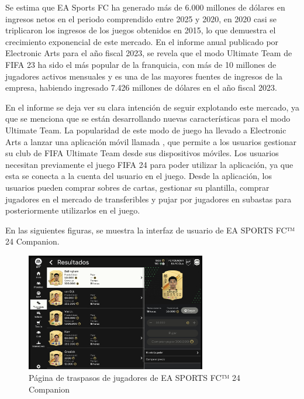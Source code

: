 Se estima que EA Sports FC ha generado más de 6.000 millones de dólares en ingresos netos en el periodo comprendido entre 2025 y 2020\cite{sanmartin000MillonesDolares2021}, en 2020 casi se triplicaron los ingresos de los juegos obtenidos en 2015, lo que demuestra el crecimiento exponencial de este mercado.
En el informe anual publicado por Electronic Arts para el año fiscal 2023\cite{ea2023}, se revela que el modo Ultimate Team de FIFA 23 ha sido el más popular de la franquicia, con más de 10 millones de jugadores activos mensuales y es una de las mayores fuentes de ingresos de la empresa, habiendo ingresado 7.426 millones de dólares en el año fiscal 2023. 

En el informe se deja ver su clara intención de seguir explotando este mercado, ya que se menciona que se están desarrollando nuevas características para el modo Ultimate Team.
La popularidad de este modo de juego ha llevado a Electronic Arts a lanzar una aplicación móvil llamada , que permite a los usuarios gestionar su club de FIFA Ultimate Team desde sus dispositivos móviles.
Los usuarios necesitan previamente el juego FIFA 24 para poder utilizar la aplicación, ya que esta se conecta a la cuenta del usuario en el juego. Desde la aplicación, los usuarios pueden comprar sobres de cartas, gestionar su plantilla, comprar jugadores en el mercado de transferibles y pujar por jugadores en subastas para posteriormente utilizarlos en el juego.

En las siguientes figuras, se muestra la interfaz de usuario de EA SPORTS FC™ 24 Companion. 
\begin{figure}[H]
    \centering
    \includegraphics[width=0.7\textwidth]{figures/4-Estudio-viabilidad/4_FC_Companion.png}
    \caption{Página de traspasos de jugadores de EA SPORTS FC™ 24 Companion}
    \label{fig:ea_sports_fc_1}
    \hypertarget{fig:ea_sports_fc_1}{}
\end{figure}

